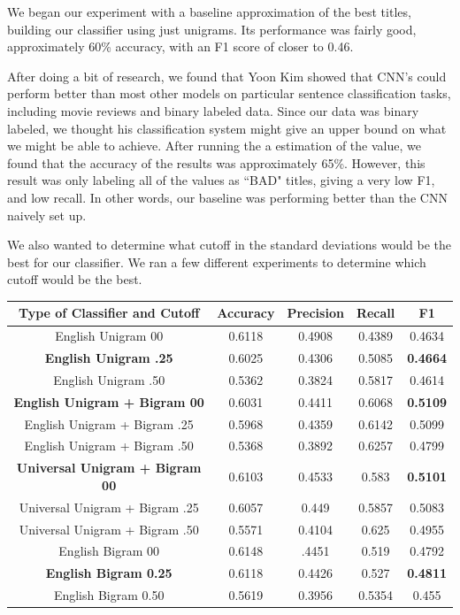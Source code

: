 \documentclass[a4paper,12pt]{article}
\begin{document}
We began our experiment with a baseline approximation of the best titles, building our classifier using just unigrams. Its performance was fairly good, approximately 60\% accuracy, with an F1 score of closer to 0.46.

After doing a bit of research, we found that  Yoon Kim showed that CNN's could perform better than most other models on particular sentence classification tasks, including movie reviews and binary labeled data. Since our data was binary labeled, we thought his classification system might give an upper bound on what we might be able to achieve. After running the a estimation of the value, we found that the accuracy of the results was approximately 65\%. However, this result was only labeling all of the values as ``BAD" titles, giving a very low F1, and low recall. In other words, our baseline was performing better than the CNN naively set up.

We also wanted to determine what cutoff in the standard deviations would be the best for our classifier. We ran a few different experiments to determine which cutoff would be the best. 
 
\begin{center}
 \begin{tabular}{|c| c| c| c| c|} 
 \hline
 Type of Classifier and Cutoff & Accuracy & Precision & Recall & F1 \\ [0.5ex] 
 \hline
 English Unigram 00 & 0.6118  & 0.4908  &0.4389  & 0.4634\\ 
 \hline
 \textbf{English Unigram .25} &  0.6025& 0.4306  & 0.5085  & \textbf{0.4664}\\ 
\hline
 English Unigram .50 & 0.5362  & 0.3824  & 0.5817  & 0.4614\\ 
\hline
  \hline
\textbf{ English Unigram + Bigram 00}& 0.6031  & 0.4411  & 0.6068  &\textbf{0.5109}\\
 \hline
 English Unigram + Bigram .25& 0.5968  & 0.4359  & 0.6142  &0.5099\\
\hline
 English Unigram + Bigram .50& 0.5368  & 0.3892  & 0.6257  &0.4799\\
\hline
 \hline
 \textbf{ Universal Unigram + Bigram 00}& 0.6103  & 0.4533  & 0.583  &\textbf{0.5101}\\
 \hline
 Universal Unigram + Bigram .25& 0.6057  & 0.449  & 0.5857  &0.5083\\
\hline
 Universal Unigram + Bigram .50& 0.5571  & 0.4104  & 0.625  &0.4955\\
\hline
 \hline
English Bigram 00 & 0.6148  & .4451  & 0.519  &0.4792\\
\hline
\textbf{English Bigram  0.25}& 0.6118  & 0.4426  & 0.527  &\textbf{0.4811}\\
\hline
English Bigram 0.50 & 0.5619  & 0.3956  & 0.5354  & 0.455\\
\hline

\end{tabular}
\end{center}
\end{document}
